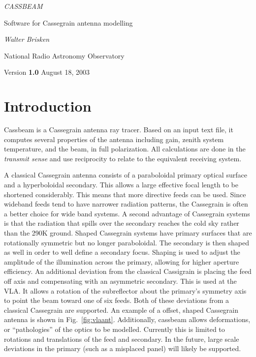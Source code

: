 \documentclass{article}
\begin{document}
\begin{center}

{\Large \it CASSBEAM}

\vspace{5pt}

Software for Cassegrain antenna modelling

\vspace{10pt}

{\it Walter Brisken}

\vspace{5pt}

National Radio Astronomy Observatory

\vspace{5 pt}

Version {\bf 1.0} \hspace{0.5in} August 18, 2003
\end{center}

\section{Introduction}

Cassbeam is a Cassegrain antenna ray tracer.  Based on an input text file,
it computes several properties of the antenna including gain,
zenith system temperature, and the beam, in full polarization.  All calculations
are done in the {\it transmit sense} and use reciprocity to relate to the
equivalent receiving system.  

A classical Cassegrain antenna consists of a paraboloidal primary optical 
surface and a hyperboloidal secondary.  This allows a large effective 
focal length to be shortened considerably.  This means that more directive
feeds can be used.  Since wideband feeds tend to have narrower radiation
patterns, the Cassegrain is often a better choice for wide band systems.
A second advantage of Cassegrain systems is that the radiation that
spills over the secondary reaches the cold sky rather than the 290K 
ground.  Shaped Cassegrain systems have primary surfaces that are rotationally
symmetric but no longer paraboloidal.  The secondary is then shaped
as well in order to well define a secondary focus.  Shaping is used to
adjust the amplitude of the illumination across the primary, allowing
for higher aperture efficiency.  An additional deviation from the 
classical Cassigrain is placing the feed off axis and compensating
with an asymmetric secondary.  This is used at the VLA.  It allows a rotation
of the subreflector about the primary's symmetry axis to point the beam 
toward one of six feeds.  Both of these deviations from a classical
Cassegrain are supported.  An example of a offset, shaped Cassegrain antenna
is shown in Fig.~\ref{fig:vlaant}.
Additionally, cassbeam allows deformations, or
``pathologies'' of the optics to be modelled.  Currently this is limited
to rotations and translations of the feed and secondary.  In the future, 
large scale deviations in the primary (such as a misplaced panel) will
likely be supported.
\end{document}
